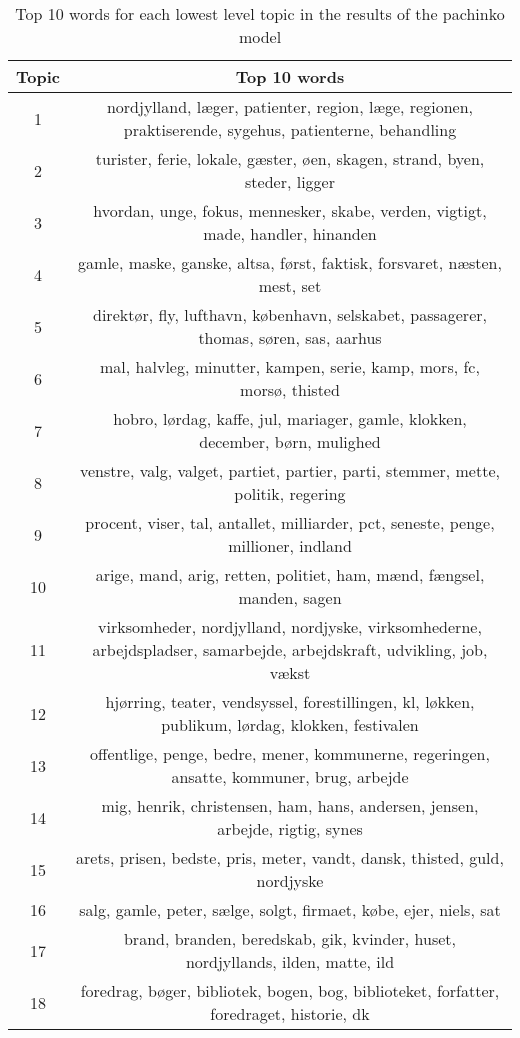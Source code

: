 \begin{longtable}[c]{c | c}
		\caption{Top 10 words for each lowest level topic in the results of the pachinko model \label{tab:pachinko_topics}}\\
		Topic & Top 10 words \\
		\hline
		\endfirsthead
		1 & nordjylland, læger, patienter, region, læge, regionen, praktiserende, sygehus, patienterne, behandling \\
		2 & turister, ferie, lokale, gæster, øen, skagen, strand, byen, steder, ligger \\
		3 & hvordan, unge, fokus, mennesker, skabe, verden, vigtigt, made, handler, hinanden \\
		4 & gamle, maske, ganske, altsa, først, faktisk, forsvaret, næsten, mest, set \\
		5 & direktør, fly, lufthavn, københavn, selskabet, passagerer, thomas, søren, sas, aarhus \\
		6 & mal, halvleg, minutter, kampen, serie, kamp, mors, fc, morsø, thisted \\
		7 & hobro, lørdag, kaffe, jul, mariager, gamle, klokken, december, børn, mulighed \\
		8 & venstre, valg, valget, partiet, partier, parti, stemmer, mette, politik, regering \\
		9 & procent, viser, tal, antallet, milliarder, pct, seneste, penge, millioner, indland \\
		10 & arige, mand, arig, retten, politiet, ham, mænd, fængsel, manden, sagen \\
		11 & virksomheder, nordjylland, nordjyske, virksomhederne, arbejdspladser, samarbejde, arbejdskraft, udvikling, job, vækst \\
		12 & hjørring, teater, vendsyssel, forestillingen, kl, løkken, publikum, lørdag, klokken, festivalen \\
		13 & offentlige, penge, bedre, mener, kommunerne, regeringen, ansatte, kommuner, brug, arbejde \\
		14 & mig, henrik, christensen, ham, hans, andersen, jensen, arbejde, rigtig, synes \\
		15 & arets, prisen, bedste, pris, meter, vandt, dansk, thisted, guld, nordjyske \\
		16 & salg, gamle, peter, sælge, solgt, firmaet, købe, ejer, niels, sat \\
		17 & brand, branden, beredskab, gik, kvinder, huset, nordjyllands, ilden, matte, ild \\
		18 & foredrag, bøger, bibliotek, bogen, bog, biblioteket, forfatter, foredraget, historie, dk \\

\end{longtable}
